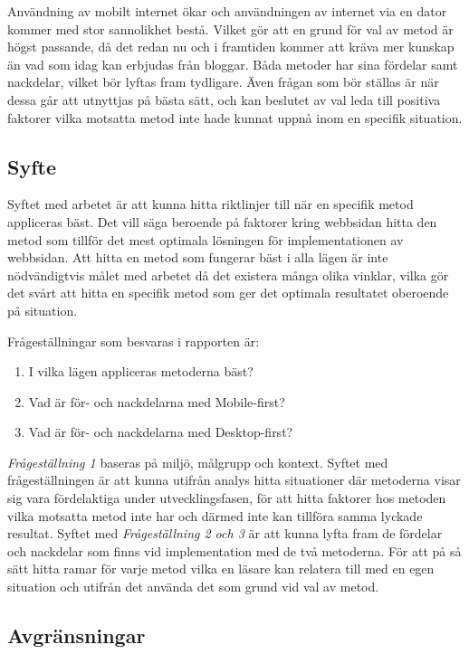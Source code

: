 \documentclass[11pt]{article}
\begin{document}
Användning av mobilt internet ökar och användningen av internet via en dator kommer med stor sannolikhet bestå. Vilket gör att en grund för val av metod är högst passande, då det redan nu och i framtiden kommer att kräva mer kunskap än vad som idag kan erbjudas från bloggar. Båda metoder har sina fördelar samt nackdelar, vilket bör lyftas fram tydligare. Även frågan som bör ställas är när dessa går att utnyttjas på bästa sätt, och kan beslutet av val leda till positiva faktorer vilka motsatta metod inte hade kunnat uppnå inom en specifik situation.

\subsection{Syfte}
Syftet med arbetet är att kunna hitta riktlinjer till när en specifik metod appliceras bäst. Det vill säga beroende på faktorer kring webbsidan hitta den metod som tillför det mest optimala lösningen för implementationen av webbsidan. Att hitta en metod som fungerar bäst i alla lägen är inte nödvändigtvis målet med arbetet då det existera många olika vinklar, vilka gör det svårt att hitta en specifik metod som ger det optimala resultatet oberoende på situation.

\vspace{0.5cm}
Frågeställningar som besvaras i rapporten är:
\begin{enumerate}
	\item I vilka lägen appliceras metoderna bäst?
	\item Vad är för- och nackdelarna med Mobile-first?
	\item Vad är för- och nackdelarna med Desktop-first?
\end{enumerate}
\vspace{0.5cm}
\textit{Frågeställning 1} baseras på miljö, målgrupp och kontext. Syftet med frågeställningen är att kunna utifrån analys hitta situationer där metoderna visar sig vara fördelaktiga under utvecklingsfasen, för att hitta faktorer hos metoden vilka motsatta metod inte har och därmed inte kan tillföra samma lyckade resultat. Syftet med \textit{Frågeställning 2 och 3} är att kunna lyfta fram de fördelar och nackdelar som finns vid implementation med de två metoderna. För att på så sätt hitta ramar för varje metod vilka en läsare kan relatera till med en egen situation och utifrån det använda det som grund vid val av metod. 

\subsection{Avgränsningar}
\end{document}
